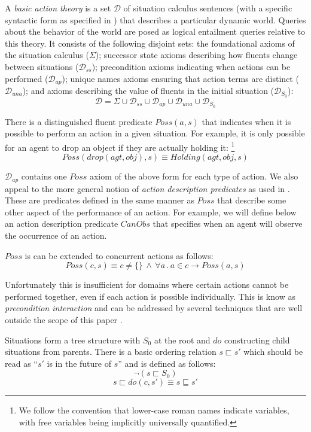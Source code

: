 \documentclass{ifaamas-submission}
\begin{document}
A \emph{basic action theory} is a set $\mathcal{D}$ of situation
calculus sentences (with a specific syntactic form as specified in
\cite{pirri99contributions_sitcalc}) that describes a particular
dynamic world. Queries about the behavior of the world are posed as
logical entailment queries relative to this theory. It consists of
the following disjoint sets: the foundational axioms of the situation
calculus ($\Sigma$); successor state axioms describing how fluents
change between situations ($\mathcal{D}_{ss}$); precondition axioms
indicating when actions can be performed ($\mathcal{D}_{ap}$); unique
names axioms ensuring that action terms are distinct ($\mathcal{D}_{una}$);
and axioms describing the value of fluents in the initial situation
($\mathcal{D}_{S_{0}}$):\[
\mathcal{D}=\Sigma\cup\mathcal{D}_{ss}\cup\mathcal{D}_{ap}\cup\mathcal{D}_{una}\cup\mathcal{D}_{S_{0}}\]


There is a distinguished fluent predicate $Poss(a,s)$ that indicates
when it is possible to perform an action in a given situation. For
example, it is only possible for an agent to drop an object if they
are actually holding it:%
\footnote{We follow the convention that lower-case roman names indicate variables,
with free variables being implicitly universally quantified.%
} \[
Poss(drop(agt,obj),s)\equiv Holding(agt,obj,s)\]


$\mathcal{D}_{ap}$ contains one $Poss$ axiom of the above form for
each type of action. We also appeal to the more general notion of
\emph{action description predicates} as used in \cite{kelly07sc_persistence}.
These are predicates defined in the same manner as $Poss$ that describe
some other aspect of the performance of an action. For example, we
will define below an action description predicate $CanObs$ that specifies
when an agent will observe the occurrence of an action.

$Poss$ is can be extended to concurrent actions as follows:\[
Poss(c,s)\equiv c\neq\{\}\,\wedge\,\forall a\,.\, a\in c\rightarrow Poss(a,s)\]


Unfortunately this is insufficient for domains where certain actions
cannot be performed together, even if each action is possible individually.
This is know as \emph{precondition interaction} and can be addressed
by several techniques that are well outside the scope of this paper
\cite{reiter96sc_nat_conc,pinto94temporal}.

Situations form a tree structure with $S_{0}$ at the root and $do$
constructing child situations from parents. There is a basic ordering
relation $s\sqsubset s'$ which should be read as {}``$s'$ is in
the future of $s$'' and is defined as follows:\[
\neg\left(s\sqsubset S_{0}\right)\]
\[
s\sqsubset do(c,s')\equiv s\sqsubseteq s'\]
\end{document}
